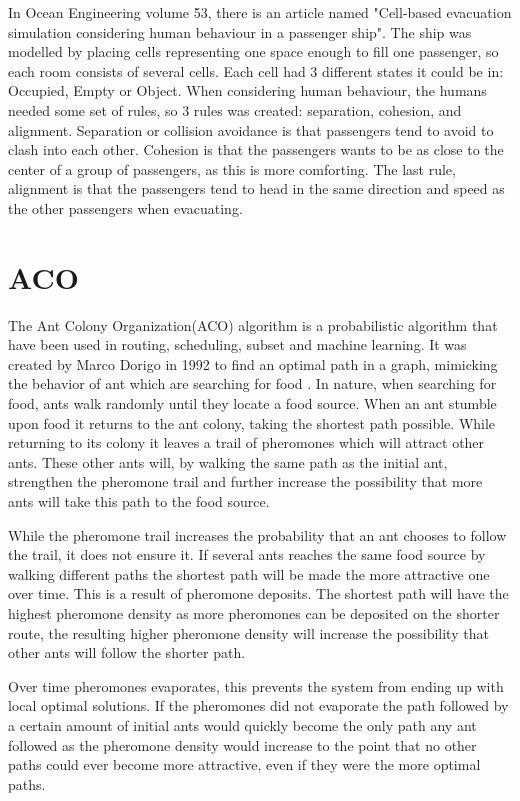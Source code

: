 In Ocean Engineering volume 53, there is an article named "Cell-based evacuation simulation considering human behaviour in a passenger ship"\cite{celleva}. 
The ship was modelled by placing cells representing one space enough to fill one passenger, so each room consists of several cells. 
Each cell had 3 different states it could be in: Occupied, Empty or Object. When considering human behaviour, the humans needed some set of rules, so 3 rules was created: separation, cohesion, and alignment. 
Separation or collision avoidance is that passengers tend to avoid to clash into each other. Cohesion is that the passengers wants to be as close to the center of a group of passengers, as this is more comforting. The last rule, alignment is that the passengers tend to head in the same direction and speed as the other passengers when evacuating.
 
 
\section{ACO}
The Ant Colony Organization(ACO) algorithm is a probabilistic algorithm that have been used in routing, scheduling, 
subset and machine learning. It was created by Marco Dorigo in 1992 to find an optimal path in a graph, mimicking the
behavior of ant which are searching for food \cite{aco}. In nature, when searching for food, ants walk randomly until
they locate a food source. When an ant stumble upon food it returns to the ant colony, taking the shortest path possible.
While returning to its colony it leaves a trail of pheromones which will attract other ants. These other ants will, by walking
the same path as the initial ant, strengthen the pheromone trail and further increase the possibility that more ants will
take this path to the food source.

While the pheromone trail increases the probability that an ant chooses to follow the trail, it does not ensure it.
If several ants reaches the same food source by walking different paths the shortest path will be made the more attractive
one over time. This is a result of pheromone deposits. The shortest path will have the highest pheromone density as more
pheromones can be deposited on the shorter route, the resulting higher pheromone density will increase the possibility that 
other ants will follow the shorter path. 

Over time pheromones evaporates, this prevents the system from ending up with local optimal solutions. 
If the pheromones did not evaporate the path followed by a certain amount of initial ants
would quickly become the only path any ant followed as the pheromone density would increase to the point that no other paths
could ever become more attractive, even if they were the more optimal paths. 

